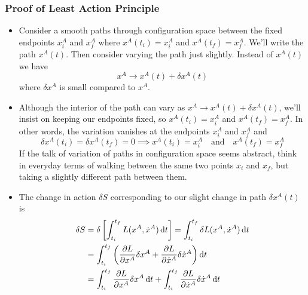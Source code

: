 \documentclass[11pt, a4paper]{article}
\newcommand{\diff}{\mathop{}\!\mathrm{d}} %
\begin{document}
\subsubsection{Proof of Least Action Principle}
\begin{itemize}
	\item Consider a smooth paths through configuration space between the fixed endpoints $ x^{A}_{i}$ and $ x^{A}_{f} $ where $ x^{A}(t_i) = x^{A}_i $ and $ x^{A}(t_f) = x^{A}_{f} $. We'll write the path $ x^{A}(t) $. Then consider varying the path just slightly. Instead of $ x^{A}(t) $ we have
	\begin{equation*}
		x^{A} \to x^{A}(t) + \delta x^{A}(t)
	\end{equation*}
	where $ \delta x^{A} $ is small compared to $ x^{A} $. 
	
	\item Although the interior of the path can vary as $ x^{A} \to x^{A}(t) + \delta x^{A}(t) $, we'll insist on keeping our endpoints fixed, so $ x^{A}(t_i) = x^{A}_i $ and $ x^{A}(t_f) = x^{A}_{f} $. In other words, the variation vanishes at the endpoints $ x^{A}_{i} $ and $ x^{A}_{f} $ and
	\begin{equation*}
		\delta x^{A}(t_{i}) = \delta x^{A}(t_{f}) = 0 \implies x^{A}(t_{i}) = x^{A}_{i} \quad \text{and} \quad x^{A}(t_{f}) = x^{A}_{f}
	\end{equation*}
	If the talk of variation of paths in configuration space seems abstract, think in everyday terms of walking between the same two points $ x_{i} $ and $ x_{f} $, but taking a slightly different path between them. 
	
	\item The change in action $ \delta S $ corresponding to our slight change in path $ \delta x^{A}(t) $ is
	\begin{align*}
		\delta S &= \delta \left[\int_{t_{i}}^{t_{f}}L(x^{A}, \dot{x}^{A}) \diff t \right] = \int_{t_{i}}^{t_{f}} \delta L(x^{A}, \dot{x}^{A}) \diff t\\
		& = \int_{t_{i}}^{t_{f}} \left(\pdv{L}{x^{A}} \delta x^{A} + \pdv{L}{\dot{x}^{A}} \delta \dot{x}^{A} \right) \diff t\\
		&= \int_{t_{i}}^{t_{f}}\pdv{L}{x^{A}} \delta x^{A} \diff t + \int_{t_{i}}^{t_{f}}\pdv{L}{\dot{x}^{A}} \delta \dot{x}^{A} \diff t
	\end{align*}
	

\end{itemize}
\end{document}
